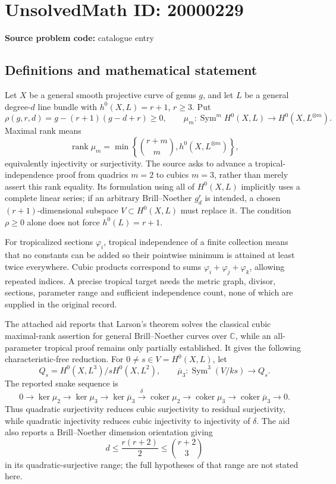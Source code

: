 \documentclass[11pt]{article}
\newcommand{\C}{\mathbb{C}}
\begin{document}
\section*{UnsolvedMath ID: 20000229}
\textbf{Source problem code:} catalogue entry
\subsection{Definitions and mathematical statement}
Let \(X\) be a general smooth projective curve of genus \(g\), and let \(L\) be a general degree-\(d\) line bundle with \(h^0(X,L)=r+1\), \(r\geq3\). Put
\[
\rho(g,r,d)=g-(r+1)(g-d+r)\geq0,
\qquad\mu_m:\operatorname{Sym}^mH^0(X,L)\longrightarrow H^0(X,L^{\otimes m}).
\]
Maximal rank means
\[
\operatorname{rank}\mu_m=\min\!\left\{\binom{r+m}{m},h^0(X,L^{\otimes m})\right\},
\]
equivalently injectivity or surjectivity. The source asks to advance a tropical-independence proof from quadrics \(m=2\) to cubics \(m=3\), rather than merely assert this rank equality. Its formulation using all of \(H^0(X,L)\) implicitly uses a complete linear series; if an arbitrary Brill--Noether \(g_d^r\) is intended, a chosen \((r+1)\)-dimensional subspace \(V\subset H^0(X,L)\) must replace it. The condition \(\rho\geq0\) alone does not force \(h^0(L)=r+1\).

For tropicalized sections \(\varphi_i\), tropical independence of a finite collection means that no constants can be added so their pointwise minimum is attained at least twice everywhere. Cubic products correspond to sums \(\varphi_i+\varphi_j+\varphi_k\), allowing repeated indices. A precise tropical target needs the metric graph, divisor, sections, parameter range and sufficient independence count, none of which are supplied in the original record.

The attached aid reports that Larson's theorem solves the classical cubic maximal-rank assertion for general Brill--Noether curves over \(\C\), while an all-parameter tropical proof remains only partially established. It gives the following characteristic-free reduction. For \(0\ne s\in V=H^0(X,L)\), let
\[
Q_s=H^0(X,L^3)/sH^0(X,L^2),\qquad
\overline\mu_3:\operatorname{Sym}^3(V/ks)\longrightarrow Q_s.
\]
The reported snake sequence is
\[
0\to\ker\mu_2\to\ker\mu_3\to\ker\overline\mu_3
\xrightarrow{\delta}\operatorname{coker}\mu_2
\to\operatorname{coker}\mu_3\to\operatorname{coker}\overline\mu_3\to0.
\]
Thus quadratic surjectivity reduces cubic surjectivity to residual surjectivity, while quadratic injectivity reduces cubic injectivity to injectivity of \(\delta\). The aid also reports a Brill--Noether dimension orientation giving
\[
d\leq\frac{r(r+2)}2\leq\binom{r+2}{3}
\]
in its quadratic-surjective range; the full hypotheses of that range are not stated here.
\end{document}
